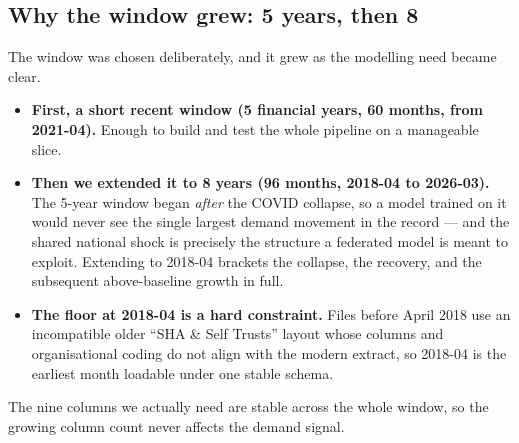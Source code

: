 \documentclass[11pt,a4paper]{article}
\begin{document}
\subsection{Why the window grew: 5 years, then 8}\label{sec:window}
The window was chosen deliberately, and it grew as the modelling need became clear.
\begin{itemize}[nosep]
  \item \textbf{First, a short recent window (5 financial years, 60 months, from 2021-04).} Enough to
        build and test the whole pipeline on a manageable slice.
  \item \textbf{Then we extended it to 8 years (96 months, 2018-04 to 2026-03).} The 5-year window began
        \emph{after} the COVID collapse, so a model trained on it would never see the single largest
        demand movement in the record --- and the shared national shock is precisely the structure a
        federated model is meant to exploit. Extending to 2018-04 brackets the collapse, the recovery,
        and the subsequent above-baseline growth in full.
  \item \textbf{The floor at 2018-04 is a hard constraint.} Files before April 2018 use an incompatible
        older ``SHA \& Self Trusts'' layout whose columns and organisational coding do not align with
        the modern extract, so 2018-04 is the earliest month loadable under one stable schema.
\end{itemize}
The nine columns we actually need are stable across the whole window, so the growing column count never
affects the demand signal.
\end{document}
